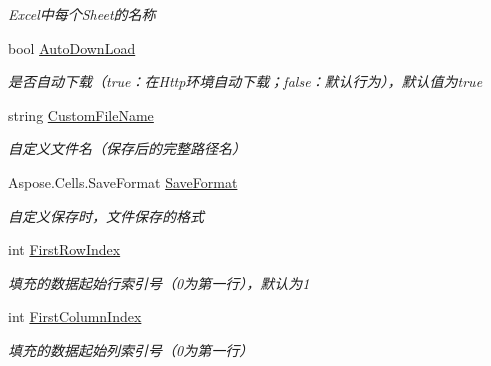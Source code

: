 \begin{DoxyCompactItemize}
\begin{DoxyCompactList}\small\item\em Excel中每个\+Sheet的名称 \end{DoxyCompactList}\item 
bool \hyperlink{class_x_c_l_net_tools_1_1_entity_1_1_office_1_1_excel_handler_1_1_out_put_param_class_a31974296d52728900508e02b4ad040b8}{Auto\+Down\+Load}
\begin{DoxyCompactList}\small\item\em 是否自动下载（true：在\+Http环境自动下载；false：默认行为），默认值为true \end{DoxyCompactList}\item 
string \hyperlink{class_x_c_l_net_tools_1_1_entity_1_1_office_1_1_excel_handler_1_1_out_put_param_class_a764a7f2a435a3b3ab61c02ff7fc0d942}{Custom\+File\+Name}
\begin{DoxyCompactList}\small\item\em 自定义文件名（保存后的完整路径名） \end{DoxyCompactList}\item 
Aspose.\+Cells.\+Save\+Format \hyperlink{class_x_c_l_net_tools_1_1_entity_1_1_office_1_1_excel_handler_1_1_out_put_param_class_a9ceabce939de783bbe5ee3774183db8e}{Save\+Format}
\begin{DoxyCompactList}\small\item\em 自定义保存时，文件保存的格式 \end{DoxyCompactList}\item 
int \hyperlink{class_x_c_l_net_tools_1_1_entity_1_1_office_1_1_excel_handler_1_1_out_put_param_class_acd2e964c33b831d1cbd69e003ccd0311}{First\+Row\+Index}
\begin{DoxyCompactList}\small\item\em 填充的数据起始行索引号（0为第一行），默认为1 \end{DoxyCompactList}\item 
int \hyperlink{class_x_c_l_net_tools_1_1_entity_1_1_office_1_1_excel_handler_1_1_out_put_param_class_aac59845922cfe83121fa7ffb39e8564b}{First\+Column\+Index}
\begin{DoxyCompactList}\small\item\em 填充的数据起始列索引号（0为第一行） \end{DoxyCompactList}\item 

\end{DoxyCompactItemize}

